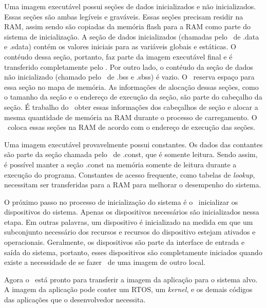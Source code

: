 Uma imagem executável possui seções de dados inicializados e não inicializados. Essas seções são ambas legíveis e graváveis. Essas seções precisam residir na RAM, assim sendo são copiadas da memória flash para a RAM como parte do sistema de inicialização. A seção de dados inicializados (chamadas pelo \linker\ de .data e .sdata) contém os valores iniciais para as variáveis globais e estáticas. O contéudo dessa seção, portanto, faz parte da imagem executável final e é transferido completamente pelo \loader. Por outro lado, o contéudo da seção de dados não inicializado (chamado pelo \linker\ de .bss e .sbss) é vazio. O \linker\ reserva espaço para essa seção no mapa de memória. As informações de alocação dessas seções, como o tamanho da seção e o endereço de execução da seção, são parte do cabeçalho da seção. É trabalho do \loader\ obter essas informações dos cabeçalhos de seção e alocar a mesma quantidade de memória na RAM durante o processo de carregamento. O \loader\ coloca essas seções na RAM de acordo com o endereço de execução das seções.

Uma imagem executável provavelmente possui constantes. Os dados das contantes são parte da seção chamada pelo \linker\ de .const, que é somente leitura. Sendo assim, é possível manter a seção .const na memória somente de leitura durante a execução do programa. Constantes de acesso frequente, como tabelas de \textit{lookup}, necessitam ser transferidas para a RAM para melhorar o desempenho do sistema.

O próximo passo no processo de inicialização do sistema é o \loader\ inicializar os dispositivos do sistema. Apenas os dispositivos necessários são inicializados nessa etapa. Em outras palavras, um dispositivo é inicializado na medida em que um subconjunto necessário dos recursos e recursos do dispositivo estejam ativados e operacionais. Geralmente, os dispositivos são parte da interface de entrada e saída do sistema, portanto, esses dispositivos são completamente iniciados quando existe a necessidade de se fazer \download\ de uma imagem de outro local.

Agora o \loader\ está pronto para transferir a imagem da aplicação para o sistema alvo. A imagem da aplicação pode conter um RTOS, um \textit{kernel}, e os demais códigos das aplicações que o desenvolvedor necessita.



